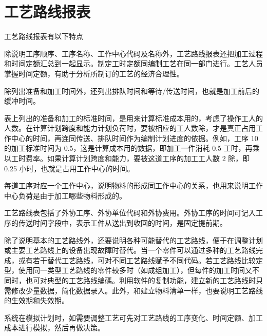 \section {工艺路线报表}

    工艺路线报表有以下特点

    \begin{enumerate.zh}

        \item 除说明工序顺序、工序名称、工作中心代码及名称外，工艺路线报表还把加工过程和时间定额汇总到一起显示。制定工时定额同编制工艺在同一部门进行。工艺人员掌握时间定额，有助于分析所制订的工艺的经济合理性。

        \item 除列出准备和加工时间外，还列出排队时间和等待/传送时间，也就是加工前后的缓冲时间。

        \item 表上列出的准备和加工的标准时间，是用来计算标准成本用的，考虑了操作工人的人数。在计算计划跨度和能力计划负荷时，要被相应的工人数除，才是真正占用工作中心的时间，再连同传送、排队时间作为编制计划进度的依据。例如，工序 10 的加工标准时间为 0.5，这是计算成本用的数据，即加工一件消耗 0.5 工时，再乘以工时费率。如果计算计划跨度和能力，要被这道工序的加工工人数 2 除，即 0.25 小时，也就是占用工作中心的时间。

        \item 每道工序对应一个工作中心，说明物料的形成同工作中心的关系，也用来说明工作中心负荷是由于加工哪些物料形成的。

        \item 工艺路线表包括了外协工序、外协单位代码和外协费用。外协工序的时间可记入工序的传送时间字段中，表示工件从送出到收回的时间，是固定提前期。

        \item  除了说明基本的工艺路线外，还要说明各种可能替代的工艺路线，便于在调整计划或主要工艺路线上的设备出现故障时替代。当一个零件可以通过多种的工艺路线完成，或有若干替代工艺路线，可对不同工艺路线赋予不同代码。若工艺路线比较定型，使用同一类型工艺路线的零件较多时（如成组加工），但每件的加工时间又不同时，也可对典型的工艺路线编碼。利用软件的复制功能，建立新的工艺路线时只需修改少量数据，简化数据录入。此外，和建立物料清单一样，也要说明工艺路线的生效期和失效期。

       \item 系统在模拟计划时，如需要调整工艺可先对工艺路线的工序变化、时间定额、加工成本进行模拟，然后再做决策。

    \end{enumerate.zh}

